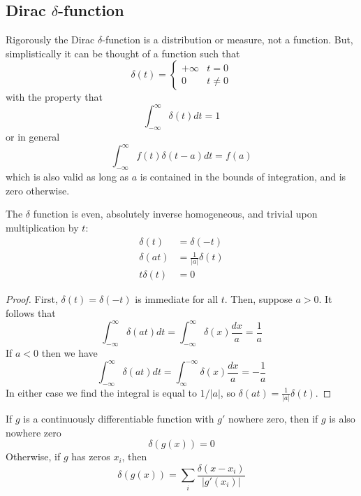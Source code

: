 \documentclass[12pt, a4paper, oneside, openright, titlepage]{book}
\begin{document}
\subsection{Dirac \texorpdfstring{$\delta$}{delta}-function}

\begin{defn}
    Rigorously the Dirac $\delta$-function is a distribution or measure, not a function. But, simplistically it can be thought of a function such that $$\delta(t) = \left\{\begin{array}{lc} +\infty & t=0 \\ 0 & t\neq 0\end{array}\right.$$ with the property that $$\int_{-\infty}^{\infty}\delta(t)dt = 1$$ or in general \begin{equation}
        \int_{-\infty}^{\infty}f(t)\delta(t-a)dt = f(a)
    \end{equation}
    which is also valid as long as $a$ is contained in the bounds of integration, and is zero otherwise.
\end{defn}

\begin{prop}
    The $\delta$ function is even, absolutely inverse homogeneous, and trivial upon multiplication by $t$: \begin{align*}
        \delta(t) &= \delta(-t) \\
        \delta(at) &= \frac{1}{|a|}\delta(t) \\
        t\delta(t) &= 0
    \end{align*}
\end{prop}
\begin{proof}
    First, $\delta(t) = \delta(-t)$ is immediate for all $t$. Then, suppose $a > 0$. It follows that \begin{equation*}
        \int_{-\infty}^{\infty}\delta(at)dt = \int_{-\infty}^{\infty}\delta(x)\frac{dx}{a} = \frac{1}{a}
    \end{equation*}
    If $a < 0$ then we have \begin{equation*}
        \int_{-\infty}^{\infty}\delta(at)dt = \int_{\infty}^{-\infty}\delta(x)\frac{dx}{a} = -\frac{1}{a}
    \end{equation*}
    In either case we find the integral is equal to $1/|a|$, so $\delta(at) = \frac{1}{|a|}\delta(t)$.
\end{proof}

\begin{prop}
    If $g$ is a continuously differentiable function with $g'$ nowhere zero, then if $g$ is also nowhere zero \begin{equation*}
        \delta(g(x)) = 0
    \end{equation*}
    Otherwise, if $g$ has zeros $x_i$, then \begin{equation*}
        \delta(g(x)) = \sum_i\frac{\delta(x-x_i)}{|g'(x_i)|}
    \end{equation*}
\end{prop}
\end{document}
